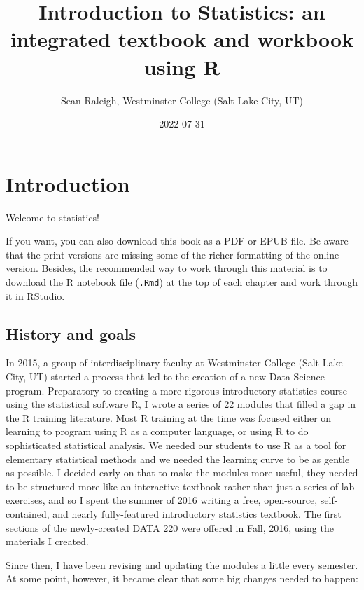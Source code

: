 \documentclass[
]{book}
\title{Introduction to Statistics: an integrated textbook and workbook using R}
\author{Sean Raleigh, Westminster College (Salt Lake City, UT)}
\date{2022-07-31}
\begin{document}
\maketitle

{
\setcounter{tocdepth}{1}
\tableofcontents
}
\hypertarget{intro}{%
\chapter*{Introduction}\label{intro}}

Welcome to statistics!

If you want, you can also download this book as a PDF or EPUB file. Be aware that the print versions are missing some of the richer formatting of the online version. Besides, the recommended way to work through this material is to download the R notebook file (\texttt{.Rmd}) at the top of each chapter and work through it in RStudio.

\hypertarget{intro-history}{%
\section*{History and goals}\label{intro-history}}

In 2015, a group of interdisciplinary faculty at Westminster College (Salt Lake City, UT) started a process that led to the creation of a new Data Science program. Preparatory to creating a more rigorous introductory statistics course using the statistical software R, I wrote a series of 22 modules that filled a gap in the R training literature. Most R training at the time was focused either on learning to program using R as a computer language, or using R to do sophisticated statistical analysis. We needed our students to use R as a tool for elementary statistical methods and we needed the learning curve to be as gentle as possible. I decided early on that to make the modules more useful, they needed to be structured more like an interactive textbook rather than just a series of lab exercises, and so I spent the summer of 2016 writing a free, open-source, self-contained, and nearly fully-featured introductory statistics textbook. The first sections of the newly-created DATA 220 were offered in Fall, 2016, using the materials I created.

Since then, I have been revising and updating the modules a little every semester. At some point, however, it became clear that some big changes needed to happen:
\end{document}
